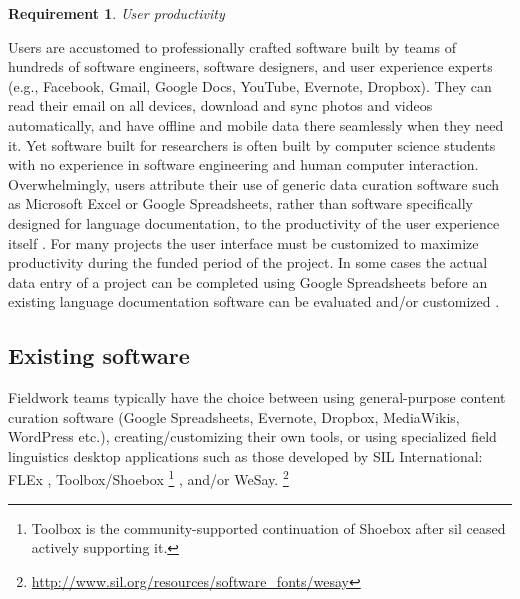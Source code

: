 \documentclass[11pt]{article}
\newcommand{\smalltodo}[2][]
    {\todo[caption={#2}, #1]
    {\tiny#2\normalsize}}
\newtheorem{requirement}{Requirement}
\begin{document}



\begin{requirement}
	\label{req:productivity}
       User productivity
\end{requirement}

Users are accustomed to professionally crafted software built by teams
of hundreds of software engineers, software designers, and user experience
experts (e.g., Facebook, Gmail, Google Docs, YouTube, Evernote, Dropbox). They
can read their email on all devices, download and sync photos and videos
automatically, and have offline and mobile data there seamlessly when they need
it. Yet software built for researchers is often built by computer science
students with no experience in software engineering and human computer
interaction. Overwhelmingly, users attribute their use of generic
data curation software such as Microsoft Excel or Google Spreadsheets, rather
than software specifically designed for language documentation, to the
productivity of the user experience itself  \cite{lingsync:2012}. For many
projects the user interface must be customized to maximize productivity during
the funded period of the project. In some cases the actual data entry of
a project can be completed using Google Spreadsheets before an existing language
documentation software can be evaluated and/or customized \cite{Troy:2014}.



\subsection{Existing software}
\label{sec:existing-software}

Fieldwork teams typically have the choice between using general-purpose content
curation software (Google Spreadsheets, Evernote, Dropbox, MediaWikis,
WordPress etc.), creating/customizing their own tools, or using specialized
field linguistics desktop applications such as those developed by SIL
International: FLEx \cite{sil-flex}, Toolbox/Shoebox%
\footnote{Toolbox is the community-supported continuation of Shoebox after
\gls{sil} ceased actively supporting it.} %
\cite{sil-toolbox-info}, and/or WeSay.%
\footnote{\url{http://www.sil.org/resources/software\_fonts/wesay}}
\end{document}
